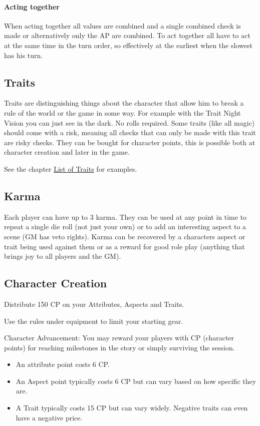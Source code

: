 \documentclass[11pt]{article}
\begin{document}
{\paragraph*{Acting together}
\label{sec:orgb4322ec}
When acting together all values are combined and a single combined check is made or alternatively only the AP are combined. To act together all have to act at the same time in the turn order, so effectively at the earliest when the slowest has his turn.

\subsection{Traits}
\label{sec:orgd0a2dd3}
Traits are distinguishing things about the character that allow him to break a rule of the world or the game in some way. For example with the Trait Night Vision you can just see in the dark. No rolls required. Some traits (like all magic) should come with a risk, meaning all checks that can only be made with this trait are risky checks. They can be bought for character points, this is possible both at character creation and later in the game.

See the chapter \hyperref[sec:orga2eb42f]{List of Traits} for examples.

\subsection{Karma}
\label{sec:orga43a48a}
Each player can have up to 3 karma. They can be used at any point in time to repeat a single die roll (not just your own) or to add an interesting aspect to a scene (GM has veto rights). Karma can be recovered by a characters aspect or trait being used against them or as a reward for good role play (anything that brings joy to all players and the GM). 


\subsection{Character Creation}
\label{sec:orgb6d437b}
Distribute 150 CP on your Attributes, Aspects and Traits.

Use the rules under equipment to limit your starting gear.

Character Advancement:
You may reward your players with CP (character points) for reaching milestones in the story or simply surviving the session.

\begin{itemize}
\item An attribute point costs 6 CP.
\item An Aspect point typically costs 6 CP but can vary based on how specific they are.
\item A Trait typically costs 15 CP but can vary widely. Negative traits can even have a negative price.
\end{itemize}

}
\end{document}
